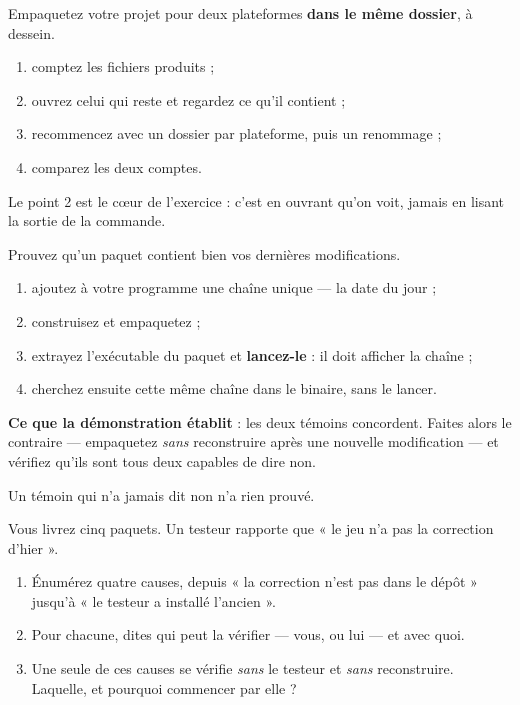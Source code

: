 \begin{nkpratique}
Empaquetez votre projet pour deux plateformes \textbf{dans le même dossier}, à
dessein.

\begin{enumerate}
\item comptez les fichiers produits ;
\item ouvrez celui qui reste et regardez ce qu'il contient ;
\item recommencez avec un dossier par plateforme, puis un renommage ;
\item comparez les deux comptes.
\end{enumerate}

Le point 2 est le c\oe ur de l'exercice : c'est en ouvrant qu'on voit, jamais
en lisant la sortie de la commande.
\end{nkpratique}

\begin{nkdemo}
Prouvez qu'un paquet contient bien vos dernières modifications.

\begin{enumerate}
\item ajoutez à votre programme une chaîne unique --- la date du jour ;
\item construisez et empaquetez ;
\item extrayez l'exécutable du paquet et \textbf{lancez-le} : il doit afficher
      la chaîne ;
\item cherchez ensuite cette même chaîne dans le binaire, sans le lancer.
\end{enumerate}

\textbf{Ce que la démonstration établit} : les deux témoins concordent. Faites
alors le contraire --- empaquetez \emph{sans} reconstruire après une nouvelle
modification --- et vérifiez qu'ils sont tous deux capables de dire non.

\alerte{} Un témoin qui n'a jamais dit non n'a rien prouvé.
\end{nkdemo}

\begin{nklogique}
Vous livrez cinq paquets. Un testeur rapporte que « le jeu n'a pas la correction
d'hier ».

\begin{enumerate}
\item Énumérez quatre causes, depuis « la correction n'est pas dans le dépôt »
      jusqu'à « le testeur a installé l'ancien ».
\item Pour chacune, dites qui peut la vérifier --- vous, ou lui --- et avec quoi.
\item Une seule de ces causes se vérifie \emph{sans} le testeur et \emph{sans}
      reconstruire. Laquelle, et pourquoi commencer par elle ?
\end{enumerate}
\end{nklogique}
